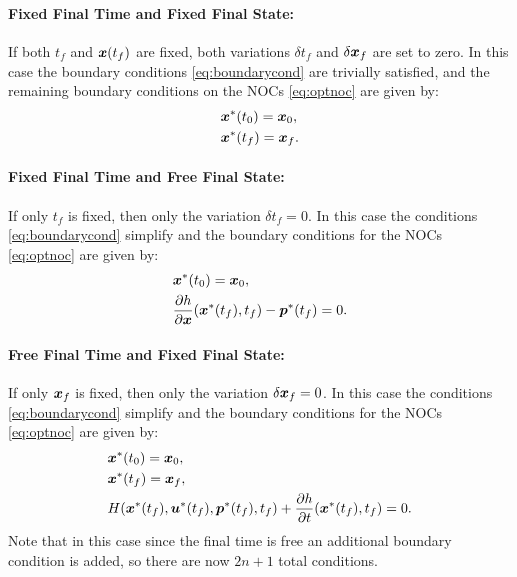 \paragraph{Fixed Final Time and Fixed Final State:} If both $t_f$ and $\bm{x}(t_f)$ are fixed, both variations $\delta t_f$ and $\delta \bm{x}_f$ are set to zero. In this case the boundary conditions \eqref{eq:boundarycond} are trivially satisfied, and the remaining boundary conditions on the NOCs \eqref{eq:optnoc} are given by:
\begin{equation*}
\begin{split}
&\bm{x}^*(t_0) = \bm{x}_0, \\
&\bm{x}^*(t_f) = \bm{x}_f.
\end{split}
\end{equation*}

\paragraph{Fixed Final Time and Free Final State:} If only $t_f$ is fixed, then only the variation $\delta t_f = 0$. In this case the conditions \eqref{eq:boundarycond} simplify and the boundary conditions for the NOCs \eqref{eq:optnoc} are given by:
\begin{equation*}
\begin{split}
&\bm{x}^*(t_0) = \bm{x}_0, \\
&\frac{\partial h }{\partial \bm{x}} (\bm{x}^* (t_f), t_f) - \bm{p}^*(t_f) = 0.  
\end{split}
\end{equation*}

\paragraph{Free Final Time and Fixed Final State:} If only $\bm{x}_f$ is fixed, then only the variation $\delta \bm{x}_f = 0$. In this case the conditions \eqref{eq:boundarycond} simplify and the boundary conditions for the NOCs \eqref{eq:optnoc} are given by:
\begin{equation*}
\begin{split}
&\bm{x}^*(t_0) = \bm{x}_0, \\
&\bm{x}^*(t_f) = \bm{x}_f, \\
&H(\bm{x}^*(t_f), \bm{u}^*(t_f), \bm{p}^*(t_f), t_f) +\frac{\partial{h}}{\partial{t}}(\bm{x}^*(t_f), t_f) = 0.  
\end{split}
\end{equation*}
Note that in this case since the final time is free an additional boundary condition is added, so there are now $2n + 1$ total conditions.

